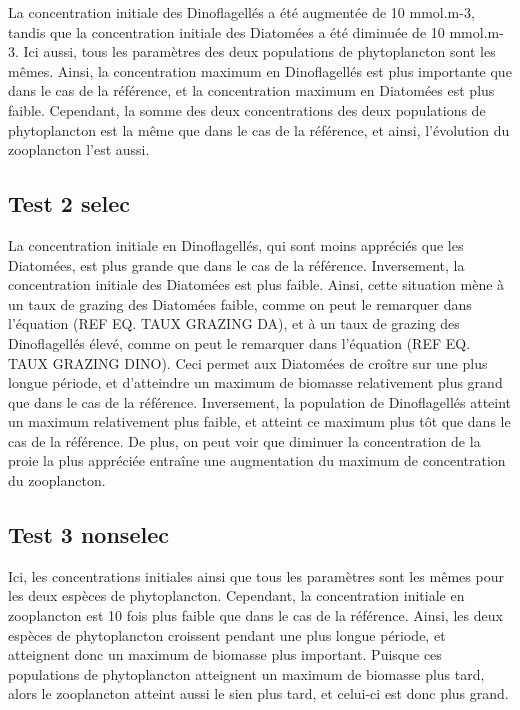 La concentration initiale des Dinoflagellés a été augmentée de 10 mmol.m-3, tandis que la concentration initiale des Diatomées a été diminuée de 10 mmol.m-3. Ici aussi, tous les paramètres des deux populations de phytoplancton sont les mêmes. Ainsi, la concentration maximum en Dinoflagellés est plus importante que dans le cas de la référence, et la concentration maximum en Diatomées est plus faible. Cependant, la somme des deux concentrations des deux populations de phytoplancton est la même que dans le cas de la référence, et ainsi, l'évolution du zooplancton l'est aussi.

\subsection{Test 2 selec}

La concentration initiale en Dinoflagellés, qui sont moins appréciés que les Diatomées, est plus grande que dans le cas de la référence. Inversement, la concentration initiale des Diatomées est plus faible. Ainsi, cette situation mène à un taux de grazing des Diatomées faible, comme on peut le remarquer dans l'équation (REF EQ. TAUX GRAZING DA), et à un taux de grazing des Dinoflagellés élevé, comme on peut le remarquer dans l'équation (REF EQ. TAUX GRAZING DINO). Ceci permet aux Diatomées de croître sur une plus longue période, et d'atteindre un maximum de biomasse relativement plus grand que dans le cas de la référence. Inversement, la population de Dinoflagellés atteint un maximum relativement plus faible, et atteint ce maximum plus tôt que dans le cas de la référence. De plus, on peut voir que diminuer la concentration de la proie la plus appréciée entraîne une augmentation du maximum de concentration du zooplancton.

\subsection{Test 3 nonselec}

Ici, les concentrations initiales ainsi que tous les paramètres sont les mêmes pour les deux espèces de phytoplancton. Cependant, la concentration initiale en zooplancton est 10 fois plus faible que dans le cas de la référence. Ainsi, les deux espèces de phytoplancton croissent pendant une plus longue période, et atteignent donc un maximum de biomasse plus important. Puisque ces populations de phytoplancton atteignent un maximum de biomasse plus tard, alors le zooplancton atteint aussi le sien plus tard, et celui-ci est donc plus grand. 

